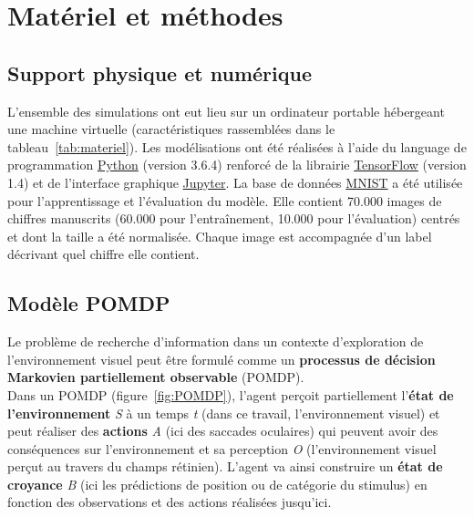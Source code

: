 
\chapter{Matériel et méthodes} %
\label{Materiel_methode} %


\section{Support physique et numérique} %
L'ensemble des simulations ont eut lieu sur un ordinateur portable hébergeant une machine virtuelle (caractéristiques rassemblées dans le tableau~\ref{tab:materiel}).
Les modélisations ont été réalisées à l'aide du language de programmation \href{https://www.python.org/}{Python} (version 3.6.4) renforcé de la librairie \href{https://www.tensorflow.org/}{TensorFlow} (version 1.4) et de l'interface graphique \href{https://jupyter.org/}{Jupyter}.
La base de données \href{http://yann.lecun.com/exdb/mnist/}{MNIST} a été utilisée pour l'apprentissage et l'évaluation du modèle. Elle contient 70.000 images de chiffres manuscrits (60.000 pour l'entraînement, 10.000 pour l'évaluation) centrés et dont la taille a été normalisée. Chaque image est accompagnée d'un label décrivant quel chiffre elle contient.


\section{Modèle POMDP} %
Le problème de recherche d'information dans un contexte d'exploration de l'environnement visuel peut être formulé comme un \textbf{processus de décision Markovien partiellement observable} (POMDP). \autocite{Butko2010} \\
Dans un POMDP (figure~\ref{fig:POMDP}), l'agent perçoit partiellement l'\textbf{état de l'environnement} \textit{S} à un temps \textit{t} (dans ce travail, l'environnement visuel) et peut réaliser des \textbf{actions} \textit{A} (ici des saccades oculaires) qui peuvent avoir des conséquences sur l'environnement et sa perception \textit{O} (l'environnement visuel perçut au travers du champs rétinien). L'agent va ainsi construire un \textbf{état de croyance} \textit{B} (ici les prédictions de position ou de catégorie du stimulus) en fonction des observations et des actions réalisées jusqu'ici. \autocite{Butko2010, Potthast2016} \\

